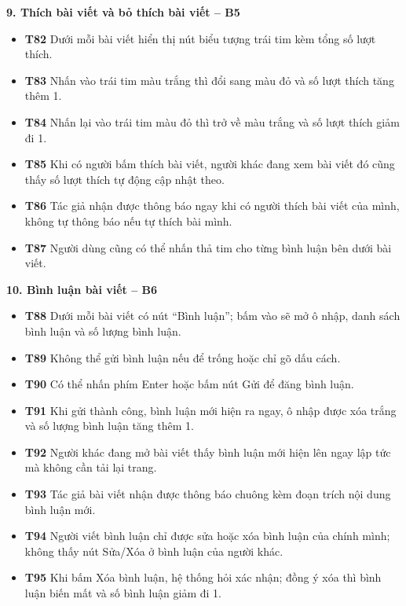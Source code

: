 \documentclass[11pt,a4paper]{article}
\begin{document}
\smallskip
\noindent\textbf{9. Thích bài viết và bỏ thích bài viết -- B5}
\begin{itemize}[leftmargin=0.9cm, label=$\bullet$, itemsep=2pt, topsep=4pt]
    \item \textbf{T82} Dưới mỗi bài viết hiển thị nút biểu tượng trái tim kèm tổng số lượt thích.
    \item \textbf{T83} Nhấn vào trái tim màu trắng thì đổi sang màu đỏ và số lượt thích tăng thêm 1.
    \item \textbf{T84} Nhấn lại vào trái tim màu đỏ thì trở về màu trắng và số lượt thích giảm đi 1.
    \item \textbf{T85} Khi có người bấm thích bài viết, người khác đang xem bài viết đó cũng thấy số lượt thích tự động cập nhật theo.
    \item \textbf{T86} Tác giả nhận được thông báo ngay khi có người thích bài viết của mình, không tự thông báo nếu tự thích bài mình.
    \item \textbf{T87} Người dùng cũng có thể nhấn thả tim cho từng bình luận bên dưới bài viết.
\end{itemize}
\smallskip
\noindent\textbf{10. Bình luận bài viết -- B6}
\begin{itemize}[leftmargin=0.9cm, label=$\bullet$, itemsep=2pt, topsep=4pt]
    \item \textbf{T88} Dưới mỗi bài viết có nút ``Bình luận''; bấm vào sẽ mở ô nhập, danh sách bình luận và số lượng bình luận.
    \item \textbf{T89} Không thể gửi bình luận nếu để trống hoặc chỉ gõ dấu cách.
    \item \textbf{T90} Có thể nhấn phím Enter hoặc bấm nút Gửi để đăng bình luận.
    \item \textbf{T91} Khi gửi thành công, bình luận mới hiện ra ngay, ô nhập được xóa trắng và số lượng bình luận tăng thêm 1.
    \item \textbf{T92} Người khác đang mở bài viết thấy bình luận mới hiện lên ngay lập tức mà không cần tải lại trang.
    \item \textbf{T93} Tác giả bài viết nhận được thông báo chuông kèm đoạn trích nội dung bình luận mới.
    \item \textbf{T94} Người viết bình luận chỉ được sửa hoặc xóa bình luận của chính mình; không thấy nút Sửa/Xóa ở bình luận của người khác.
    \item \textbf{T95} Khi bấm Xóa bình luận, hệ thống hỏi xác nhận; đồng ý xóa thì bình luận biến mất và số bình luận giảm đi 1.
\end{itemize}
\end{document}
